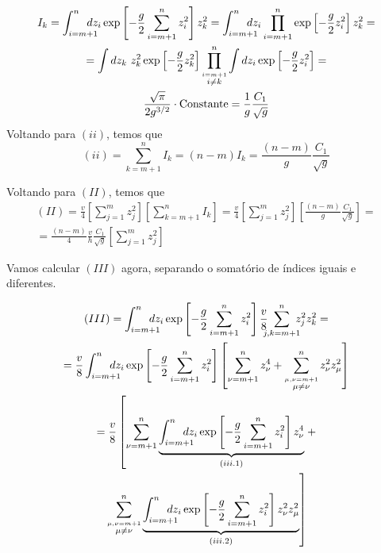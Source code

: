 \documentclass{beamer}
\begin{document}
\begin{frame}
	
	{\small
	\begin{multline*}
		I_k = \int_{i=m+1}^{n}\hspace{-12pt} dz_i \exp\left[ -\frac{g}{2}\sum_{i=m+1}^{n}  z_i^2 \right] z_k^2 = \int_{i=m+1}^{n}\hspace{-12pt} dz_i \prod_{i=m+1}^{n}\exp\left[ -\frac{g}{2}  z_i^2 \right] z_k^2 = \\
		= \int dz_k \ z_k^2 \exp\left[-\frac{g}{2}z_k^2\right] \prod_{\stackrel{i=m+1}{i\neq k}}^{n}\int dz_i\exp\left[ -\frac{g}{2}  z_i^2 \right] = \\ 
		\frac{\sqrt{\pi}}{2g^{3/2}} \cdot \text{Constante} = \frac{1}{g}\frac{C_1}{\sqrt{g}} \\
	\end{multline*}
	}
	Voltando para $(ii)$, temos que
	\begin{equation*}
		(ii) = \sum_{k=m+1}^{n} I_k = (n-m)I_k = \frac{(n-m)}{g}\frac{C_1}{\sqrt{g}}  
	\end{equation*}
\end{frame}

\begin{frame}
	Voltando para $(II)$, temos que
	\begin{multline*}
		(II) = \frac{v}{4}\left[\sum_{j=1}^{m}z_j^2\right]\left[\sum_{k=m+1}^{n}I_k\right] = \frac{v}{4}\left[\sum_{j=1}^{m}z_j^2\right]\left[\frac{(n-m)}{g}\frac{C_1}{\sqrt{g}}\right] = \\ 
		= \frac{(n-m)}{4}\frac{v}{h}\frac{C_1}{\sqrt{g}}\left[\sum_{j=1}^{m}z_j^2\right]
	\end{multline*}

	Vamos calcular $(III)$ agora, separando o somatório de índices iguais e diferentes.
\end{frame}

\begin{frame}

	\small
	\begin{multline*}
		(III) = \int_{i=m+1}^{n}\hspace{-12pt} dz_i \exp\left[ -\frac{g}{2}\sum_{i=m+1}^{n}  z_i^2 \right] \frac{v}{8}\hspace{-6pt}\sum_{j,k=m+1}^{n} \hspace{-6pt} z_j^2 z_k^2 = \\ %
		= \frac{v}{8}\int_{i=m+1}^{n}\hspace{-12pt} dz_i \exp\left[ -\frac{g}{2}\sum_{i=m+1}^{n}  z_i^2 \right]\left[\sum_{\nu=m+1}^{n}z_\nu^4 + \sum_{\stackrel{\mu,\nu=m+1}{\mu\neq\nu}}^{n}z_\nu^2z_\mu^2\right]  \\ %
		= \frac{v}{8}\left[\sum_{\nu=m+1}^{n} \underbrace{\int_{i=m+1}^{n}\hspace{-12pt} dz_i\exp\left[ -\frac{g}{2}\sum_{i=m+1}^{n}  z_i^2 \right]z_\nu^4}_{(iii.1)}\right. + \\ 
		\left.\sum_{\stackrel{\mu,\nu=m+1}{\mu\neq\nu}}^{n}\underbrace{\int_{i=m+1}^{n}\hspace{-12pt} dz_i \exp\left[ -\frac{g}{2}\sum_{i=m+1}^{n}  z_i^2 \right]z_\nu^2z_\mu^2}_{(iii.2)}\right]  %
	\end{multline*}
\end{frame}
\end{document}
